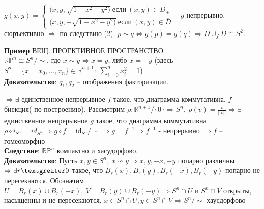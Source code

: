 	$g(x,y)= 
	\begin{cases}
	(x,y,\sqrt{1 - x^2 - y^2)}\ \text{если}\ (x,y)\in \overline{D}_{+}\\ 
	(x,y, -\sqrt{1 - x^2 - y^2)}\ \text{если}\ (x,y)\in \overline{D}_{-}
	\end{cases}$
	$g$ непрерывно, сюръективно $\Rightarrow$ по следствию (2): $p\sim q \Leftrightarrow g(p) = g(q) \Rightarrow \overline{D} {\cup}_{f} \overline{D} \cong S^2.$
	\begin{figure}[h]
	\end{figure}
	\textbf{Пример} ВЕЩ. ПРОЕКТИВНОЕ ПРОСТРАНСТВО\\
	$\mathbb{R} \mathbb{P}^n \cong S^n\slash\sim$, где $x\sim y \Leftrightarrow x = y$, либо $x = -y$ (здесь $S^n=\{x = x_0,\ldots ,x_n\}\in \mathbb{R}^{n + 1}:\ \sum\limits^{n}_{i = 0} x_i^2=1$)\\
	\textbf{Доказательство}: $q_1, q_2$ -- отображения факторизации.
	\begin{figure}[h]
	\end{figure}
	$\Rightarrow \exists$ единственное непрерывное $f$ такое, что диаграмма коммутативна, $f$ -- биекция( по построению). Рассмотрим $\rho: \mathbb{R}^{n + 1}\slash\{0\} \Rightarrow S^n,\ \rho(v) = \frac{v}{||v||} \Rightarrow \exists$ единственное непрерывное $g$ такое, что диаграмма коммутативна $\rho \circ i_{S^n} = id_{S^n} \Rightarrow g \circ f=\text{id}_{S^n}\slash\sim \Rightarrow g=f^{-1} \Rightarrow f^{-1}$ - непрерывно $\Rightarrow f$ -- гомеоморфно\\
	\textbf{Следствие}: $\mathbb{R} \mathbb{P}^n$ компактно и хасудорфово.\\
	\textbf{Доказательство}: Пусть $x,y \in S^n,\ x\nsim y\Rightarrow x,y, -x, -y$ попарно различны $\Rightarrow \exists r\textgreater 0$ такое, что $B_r(x), B_r(y), B_r(-x), B_r(-y)$ попарно не пересекаются. Обозначим $U=B_r(x)\cup B_r( - x),\ V = B_r(y)\cup B_r(-y) \Rightarrow S^n\cap U$ и $S^n\cap V$ открыты, насыщенны и не пересекаются, $x\in S^n\cap U, y\in S^n\cap V \Rightarrow S^n\slash \sim$ хаусдорфово\\
	\begin{figure}[h]
	\end{figure}

\newpage
